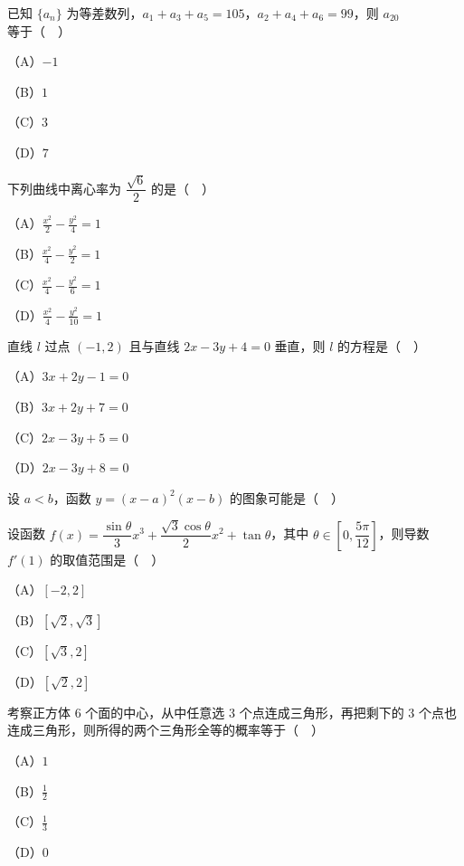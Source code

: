 \begin{question}
已知 $\{a_n\}$ 为等差数列，$a_1+a_3+a_5=105$，$a_2+a_4+a_6=99$，则 $a_{20}$ 等于（　）

（A）$-1$

（B）$1$

（C）$3$

（D）$7$

\end{question}
\begin{question}
下列曲线中离心率为 $\dfrac{\sqrt6}{2}$ 的是（　）

（A）$\frac{x^2}{2}-\frac{y^2}{4}=1$

（B）$\frac{x^2}{4}-\frac{y^2}{2}=1$

（C）$\frac{x^2}{4}-\frac{y^2}{6}=1$

（D）$\frac{x^2}{4}-\frac{y^2}{10}=1$

\end{question}
\begin{question}
直线 $l$ 过点 $(-1,2)$ 且与直线 $2x-3y+4=0$ 垂直，则 $l$ 的方程是（　）

（A）$3x+2y-1=0$

（B）$3x+2y+7=0$

（C）$2x-3y+5=0$

（D）$2x-3y+8=0$

\Needspace{0.4\textheight}
\end{question}
\begin{question}
设 $a<b$，函数 $y=(x-a)^2(x-b)$ 的图象可能是（　）
\nopagebreak[4]
\begin{center}\end{center}
\nopagebreak[4]
\end{question}
\begin{question}
设函数 $f(x)=\dfrac{\sin\theta}{3}x^3+\dfrac{\sqrt3\cos\theta}{2}x^2+\tan\theta$，其中 $\theta\in\left[0,\dfrac{5\pi}{12}\right]$，则导数 $f'(1)$ 的取值范围是（　）

（A）$[-2,2]$

（B）$[\sqrt2,\sqrt3]$

（C）$[\sqrt3,2]$

（D）$[\sqrt2,2]$

\end{question}
\begin{question}
考察正方体 $6$ 个面的中心，从中任意选 $3$ 个点连成三角形，再把剩下的 $3$ 个点也连成三角形，则所得的两个三角形全等的概率等于（　）

（A）$1$

（B）$\frac12$

（C）$\frac13$

（D）$0$

\end{question}

